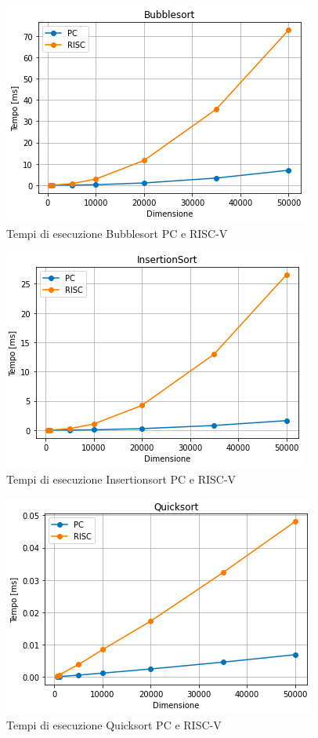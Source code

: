 \documentclass[12pt, a4paper]{report}
\begin{document}
\begin{figure}[ht]
\centering
 \includegraphics[scale=0.8]{Img/GraficiSorting/BubbleSort_Pc_Riscv.PNG}
 \caption{Tempi di esecuzione Bubblesort PC e RISC-V}
\end{figure}

\begin{figure}[ht]
\centering
 \includegraphics[scale=0.8]{Img/GraficiSorting/InsertionsortPcRisc.PNG}
 \caption{Tempi di esecuzione Insertionsort PC e RISC-V}
\end{figure}
	
\begin{figure}[ht]
\centering
 \includegraphics[scale=0.8]{Img/GraficiSorting/QuicksortPCRisc.PNG}
 \caption{Tempi di esecuzione Quicksort PC e RISC-V}
\end{figure}
\end{document}
